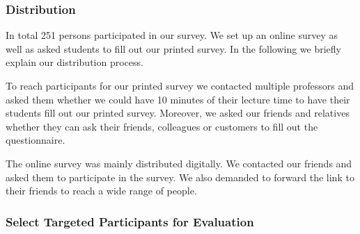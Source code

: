 \subsubsection{Distribution}
In total 251 persons participated in our survey.
 We set up an online survey as well as asked students to fill out our printed survey.
 In the following we briefly explain our distribution process.


\begin{description}[leftmargin=0cm]
	\item[Printed Survey] To reach participants for our printed survey we contacted multiple professors and asked them whether we could have 10 minutes of their lecture time to have their students fill out our printed survey.
 Moreover, we asked our friends and relatives whether they can ask their friends, colleagues or customers to fill out the questionnaire.

	\item[Online Survey] The online survey was mainly distributed digitally.
 We contacted our friends and asked them to participate in the survey.
 We also demanded to forward the link to their friends to reach a wide range of people.

\end{description}

\subsubsection{Select Targeted Participants for Evaluation}

